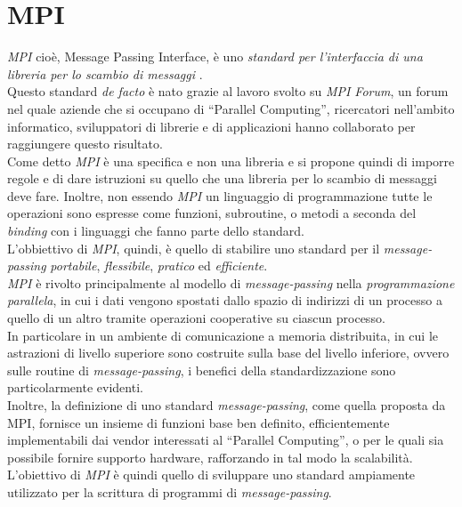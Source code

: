 
\chapter{MPI}\label{sec:second_mpi}
\emph{MPI} cioè, Message Passing Interface, è uno \textit{standard per l'interfaccia di una libreria per lo scambio di messaggi} \cite{mpi_standard}.\\
Questo standard \textit{de facto} è nato grazie al lavoro svolto su \textit{MPI Forum}, un forum nel quale aziende che si occupano di \textquotedblleft Parallel Computing\textquotedblright, ricercatori nell'ambito informatico, sviluppatori di librerie e di applicazioni hanno collaborato per raggiungere questo risultato.\\
Come detto \textit{MPI} è una specifica e non una libreria e si propone quindi di imporre regole e di dare istruzioni su quello che una libreria per lo scambio di messaggi deve fare. Inoltre, non essendo \textit{MPI} un linguaggio di programmazione tutte le operazioni sono espresse come funzioni, subroutine, o metodi a seconda del \textit{binding} con i linguaggi che fanno parte dello standard.\\
L'obbiettivo di \textit{MPI}, quindi, è quello di stabilire uno standard per il \textit{message-passing} \emph{portabile}, \emph{flessibile}, \emph{pratico} ed \emph{efficiente}.\\
\textit{MPI} è rivolto principalmente al modello di \textit{message-passing} nella \textit{programmazione parallela}, in cui i dati vengono spostati dallo spazio di indirizzi di un processo a quello di un altro tramite operazioni cooperative su ciascun processo.\\
In particolare in un ambiente di comunicazione a memoria distribuita, in cui le astrazioni di livello superiore sono costruite sulla base del livello inferiore, ovvero sulle routine di \textit{message-passing}, i benefici della standardizzazione sono particolarmente evidenti.\\
Inoltre, la definizione di uno standard \textit{message-passing}, come quella proposta da MPI, fornisce un insieme di funzioni base ben definito, efficientemente implementabili dai vendor interessati al \textquotedblleft Parallel Computing\textquotedblright, o per le quali sia possibile fornire supporto hardware, rafforzando in tal modo la scalabilità.\\
L'obiettivo di \textit{MPI} è quindi quello di sviluppare uno standard ampiamente utilizzato per la scrittura di programmi di \textit{message-passing}.

